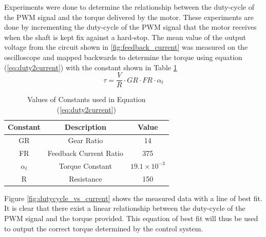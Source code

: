 Experiments were done to determine the relationship between the duty-cycle of the PWM signal and the torque delivered by the motor. These experiments are done by incrementing the duty-cycle of the PWM signal that the motor receives when the shaft is kept fix against a hard-stop. The mean value of the output voltage from the circuit shown in \ref{fig:feedback_current} was measured on the oscilloscope and mapped backwards to determine the torque using equation (\ref{eq:duty2current}) with the constant shown in Table \ref{table:duty2current_constants}
\begin{equation} \label{eq:duty2current}
\tau = \frac{V}{R}\cdot GR \cdot FR \cdot \alpha_{t}
\end{equation}

\begin{table}[]
	\centering
	\begin{tabular}{|c|c|c|}
		\hline
		Constant & Description & Value \\
		\hline
		\hline
		GR &  Gear Ratio & 14 \\
		\hline
		FR & Feedback Current Ratio & 375 \\
		\hline
		$\alpha_{t}$ & Torque Constant & $19.1\times 10^{-3}$ \\
		\hline
		R & Resistance & 150 \\
		\hline
	\end{tabular}
	\caption{Values of Constants used in Equation (\ref{eq:duty2current})}
	\label{table:duty2current_constants}
\end{table}

 Figure \ref{fig:dutycycle_vs_current} shows the measured data with a line of best fit. It is clear that there exist a linear relationship between the duty-cycle of the PWM signal and the torque provided. This equation of best fit will thus be used to output the correct torque determined by the control system.


